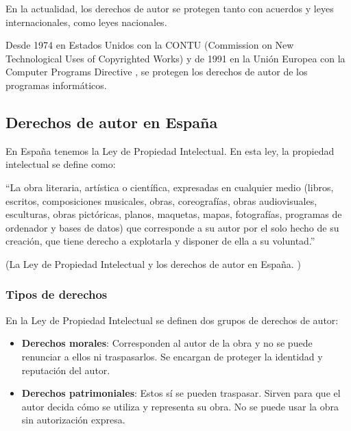             En la actualidad, los derechos de autor se protegen tanto con acuerdos y leyes internacionales, como leyes
            nacionales.

            Desde 1974 en Estados Unidos con la CONTU \cite{contu} (Commission on New Technological Uses of Copyrighted
            Works) y de 1991 en la Unión Europea con la Computer Programs Directive \cite{com_pro_dir}, se protegen los
            derechos de autor de los programas informáticos.


        \subsection{Derechos de autor en España} %
        \label{sub:DerechosDeAutorEnEspana}

            En España tenemos la Ley de Propiedad Intelectual. En esta ley, la propiedad intelectual se define como:

            ``La obra literaria, artística o científica, expresadas en cualquier medio (libros, escritos, composiciones
            musicales, obras, coreografías, obras audiovisuales, esculturas, obras pictóricas, planos, maquetas, mapas,
            fotografías, programas de ordenador y bases de datos) que corresponde a su autor por el solo hecho de su
            creación, que tiene derecho a explotarla y disponer de ella a su voluntad.''

            \begin{flushright}
                (La Ley de Propiedad Intelectual y los derechos de autor en España. \cite{propiedad_intelectual_espana})
            \end{flushright}

            \subsubsection{Tipos de derechos} %
            \label{ssub:TiposDeDerechos}

                En la Ley de Propiedad Intelectual se definen dos grupos de derechos de autor:

                \begin{itemize}
                    \item \textbf{Derechos morales}: Corresponden al autor de la obra y no se puede renunciar a ellos ni
                    traspasarlos. Se encargan de proteger la identidad y reputación del autor.
                    \item \textbf{Derechos patrimoniales}: Estos sí se pueden traspasar. Sirven para que el autor decida
                    cómo se utiliza y representa su obra. No se puede usar la obra sin autorización expresa.
                \end{itemize}

